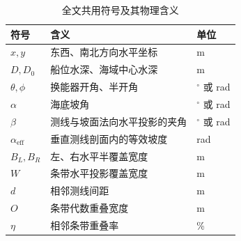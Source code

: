 \begin{table}[H]
  \centering
  \caption{全文共用符号及其物理含义}
  \label{tab:symbols}
  \begin{tabular}{lll}
    \toprule
    \textbf{符号} & \textbf{含义} & \textbf{单位} \\
    \midrule
    $x,y$ & 东西、南北方向水平坐标 & m \\
    $D,D_0$ & 船位水深、海域中心水深 & m \\
    $\theta,\phi$ & 换能器开角、半开角 & $^\circ$ 或 rad \\
    $\alpha$ & 海底坡角 & $^\circ$ 或 rad \\
    $\beta$ & 测线与坡面法向水平投影的夹角 & $^\circ$ 或 rad \\
    $\alpha_{\mathrm{eff}}$ & 垂直测线剖面内的等效坡度 & rad \\
    $B_L,B_R$ & 左、右水平半覆盖宽度 & m \\
    $W$ & 条带水平投影覆盖宽度 & m \\
    $d$ & 相邻测线间距 & m \\
    $O$ & 条带代数重叠宽度 & m \\
    $\eta$ & 相邻条带重叠率 & \% \\
    \bottomrule
  \end{tabular}
\end{table}
